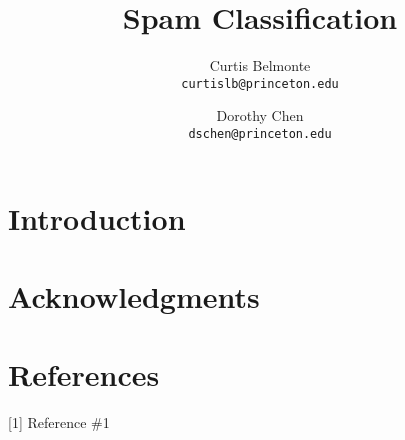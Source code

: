 \documentclass[10pt,twocolumn,letterpaper]{article}
\begin{document}
\title{Spam Classification}

\author{Curtis Belmonte\\
{\tt\small curtislb@princeton.edu}
\and
Dorothy Chen\\
{\tt\small dschen@princeton.edu}
}

\maketitle

\begin{abstract}
   
\end{abstract}

\section{Introduction}


\section{Acknowledgments}


\section{References}

{\small


[1] Reference \#1

}
\end{document}
